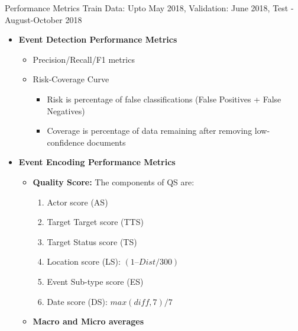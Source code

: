 \begin{frame}{Performance Metrics}
Train Data: Upto May 2018, Validation: June 2018, Test - August-October 2018
\begin{itemize}
    \item \textbf{Event Detection Performance Metrics}
    \begin{itemize}
        \item Precision/Recall/F1 metrics
        \item Risk-Coverage Curve
        \begin{itemize}
            \item Risk is percentage of false classifications (False Positives + False Negatives)
            \item Coverage is percentage of data remaining after removing low-confidence documents
        \end{itemize}
    \end{itemize}
\item \textbf{Event Encoding Performance Metrics}
    \begin{itemize}
        \item \textbf{Quality Score:}  The components of QS are:
            \begin{enumerate}
                \item Actor score (AS)
                \item Target Target score (TTS)
                \item Target Status score (TS)
                \item Location score (LS): $(1 – Dist/300)$
                \item Event Sub-type score (ES)
                \item Date score (DS): $max(diff, 7)/7$
            \end{enumerate}
         \item \textbf{Macro and Micro averages}
    \end{itemize}    
\end{itemize}
\end{frame}


